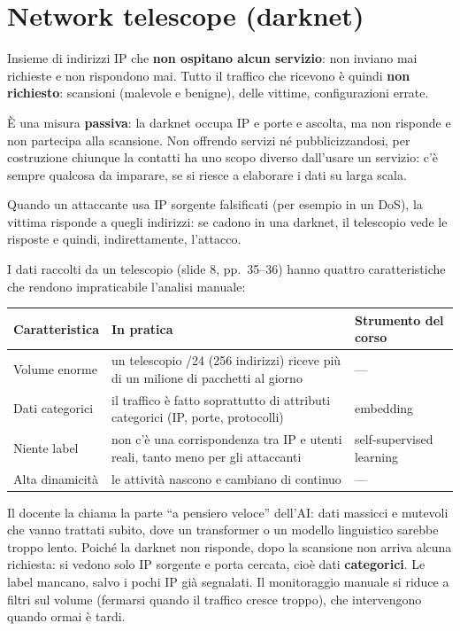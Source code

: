 \section{Network telescope (darknet)}
\begin{definizione}
Insieme di indirizzi IP che \textbf{non ospitano alcun servizio}: non inviano mai richieste e non rispondono mai. Tutto il traffico che
ricevono è quindi \textbf{non richiesto}: scansioni (malevole e benigne),  delle vittime, configurazioni errate.
\end{definizione}
È una misura \textbf{passiva}: la darknet occupa IP e porte e ascolta, ma non risponde e non partecipa alla scansione. Non offrendo
servizi né pubblicizzandosi, per costruzione chiunque la contatti ha uno scopo diverso dall'usare un servizio: c'è sempre qualcosa da
imparare, se si riesce a elaborare i dati su larga scala.
\begin{integrazione}[backscattering]
Quando un attaccante usa IP sorgente falsificati (per esempio in un DoS), la vittima risponde a quegli indirizzi: se cadono in una
darknet, il telescopio vede le risposte e quindi, indirettamente, l'attacco.
\end{integrazione}
I dati raccolti da un telescopio (slide 8, pp.~35--36) hanno quattro caratteristiche che rendono impraticabile l'analisi manuale:
\begin{center}
\small
\begin{tabularx}{\textwidth}{>{\raggedright\arraybackslash}p{3.3cm} X >{\raggedright\arraybackslash}p{3.6cm}}
\toprule
\textbf{Caratteristica} & \textbf{In pratica} & \textbf{Strumento del corso}\\
\midrule
Volume enorme & un telescopio /24 (256 indirizzi) riceve più di un milione di pacchetti al giorno & ---\\
Dati categorici & il traffico è fatto soprattutto di attributi categorici (IP, porte, protocolli) & embedding\\
Niente label & non c'è una corrispondenza tra IP e utenti reali, tanto meno per gli attaccanti & self-supervised learning\\
Alta dinamicità & le attività nascono e cambiano di continuo & ---\\
\bottomrule
\end{tabularx}
\end{center}
Il docente la chiama la parte ``a pensiero veloce'' dell'AI: dati massicci e mutevoli che vanno trattati subito, dove un transformer o un
modello linguistico sarebbe troppo lento. Poiché la darknet non risponde, dopo la scansione non arriva alcuna richiesta: si vedono solo IP
sorgente e porta cercata, cioè dati \textbf{categorici}. Le label mancano, salvo i pochi IP già segnalati. Il monitoraggio manuale si
riduce a filtri sul volume (fermarsi quando il traffico cresce troppo), che intervengono quando ormai è tardi.

